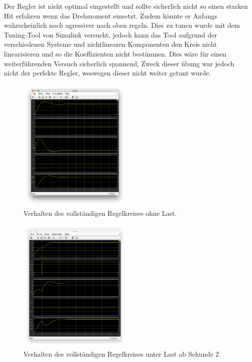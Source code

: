 \documentclass{fhnwreport} %
\begin{document}
Der Regler ist nicht optimal eingestellt und sollte sicherlich nicht so einen starken Hit erfahren wenn das Drehmoment einsetzt. Zudem könnte er Anfangs wahrscheinlich noch agressiver nach oben regeln.
Dies zu tunen wurde mit dem Tuning-Tool von Simulink versucht, jedoch kann das Tool aufgrund der verschiedenen Systeme und nichtlinearen Komponenten den Kreis nicht linearisieren und so die Koeffizienten nicht bestimmen.
Dies wäre für einen weiterführenden Versuch sicherlich spannend, Zweck dieser übung war jedoch nicht der perfekte Regler, weswegen dieser nicht weiter getunt wurde.

\begin{figure}
\begin{center}
\includegraphics[trim={2cm 3cm 2.2cm 3.7cm},clip,width=0.5\textwidth]{scope_no_load}
\caption{Verhalten des vollständigen Regelkreises ohne Last.}
\label{fig:no_load}
\end{center}
\end{figure}

\begin{figure}
\begin{center}
\includegraphics[trim={1.5cm 2.8cm 1.5cm 3.9cm},clip,width=0.5\textwidth]{scope_load}
\caption{Verhalten des vollständigen Regelkreises unter Last ab Sekunde 2.}
\label{fig:load}
\end{center}
\end{figure}
\end{document}
